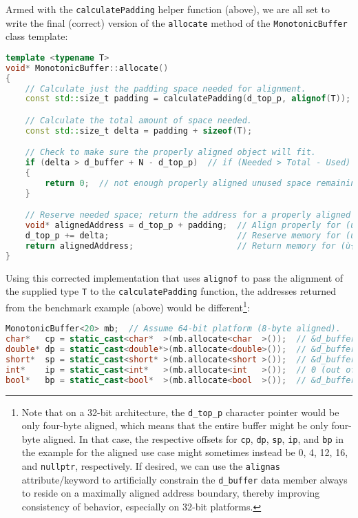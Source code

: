 \noindent Armed with the
\texttt{calculatePadding} helper function (above), we are all set to write the final (correct) version of the \texttt{allocate} method of the \texttt{MonotonicBuffer} class template:

\begin{lstlisting}[language=C++]
template <typename T>
void* MonotonicBuffer::allocate()
{
    // Calculate just the padding space needed for alignment.
    const std::size_t padding = calculatePadding(d_top_p, alignof(T));

    // Calculate the total amount of space needed.
    const std::size_t delta = padding + sizeof(T);

    // Check to make sure the properly aligned object will fit.
    if (delta > d_buffer + N - d_top_p)  // if (Needed > Total - Used)
    {
        return 0;  // not enough properly aligned unused space remaining
    }

    // Reserve needed space; return the address for a properly aligned object.
    void* alignedAddress = d_top_p + padding;  // Align properly for (ù{\codeincomments{T}}ù) object.
    d_top_p += delta;                          // Reserve memory for (ù{\codeincomments{T}}ù) object.
    return alignedAddress;                     // Return memory for (ù{\codeincomments{T}}ù) object.
}
\end{lstlisting}

\noindent Using this corrected implementation that uses \texttt{alignof} to pass
the alignment of the supplied type \texttt{T} to the
\texttt{calculatePadding} function, the addresses returned from the
benchmark example (above) would be different{\cprotect\footnote{Note
that on a 32-bit architecture, the \texttt{d\_top\_p} character
pointer would be only four-byte aligned, which means that the entire
buffer might be only four-byte aligned. In that case, the respective
offsets for \texttt{cp}, \texttt{dp}, \texttt{sp}, \texttt{ip}, and
\texttt{bp} in the example for the aligned use case might sometimes
instead be 0, 4, 12, 16, and \texttt{nullptr}, respectively. If
  desired, we can use the \texttt{alignas}
  attribute/keyword to artificially constrain the \texttt{d\_buffer}
  data member always to reside on a maximally aligned address boundary,
  thereby improving consistency of behavior, especially on 32-bit
  platforms.}}:

\begin{lstlisting}[language=C++]
MonotonicBuffer<20> mb;  // Assume 64-bit platform (8-byte aligned).
char*   cp = static_cast<char*  >(mb.allocate<char  >());  // &d_buffer[ 0]
double* dp = static_cast<double*>(mb.allocate<double>());  // &d_buffer[ 8]
short*  sp = static_cast<short* >(mb.allocate<short >());  // &d_buffer[16]
int*    ip = static_cast<int*   >(mb.allocate<int   >());  // 0 (out of space)
bool*   bp = static_cast<bool*  >(mb.allocate<bool  >());  // &d_buffer[18]
\end{lstlisting}

